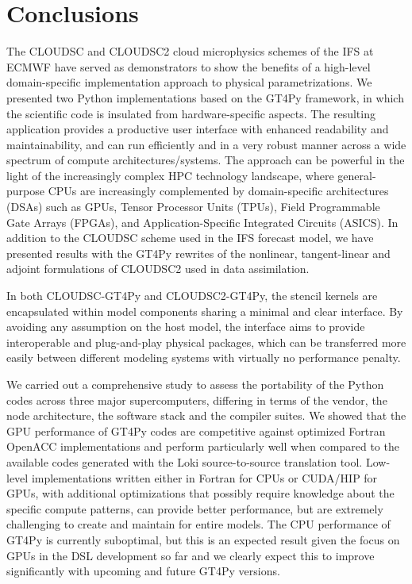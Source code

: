 \documentclass[main.tex]{subfiles}
\begin{document}
    \justifying

    \section{Conclusions}
    \label{section:conclusions}

        The CLOUDSC and CLOUDSC2 cloud microphysics schemes of the IFS at ECMWF have served as demonstrators to show the benefits of a high-level domain-specific implementation approach to physical parametrizations. We presented two Python implementations based on the GT4Py framework, in which the scientific code is insulated from hardware-specific aspects. The resulting application provides a productive user interface with enhanced readability and maintainability, and can run efficiently and in a very robust manner across a wide spectrum of compute architectures/systems. The approach can be powerful in the light of the increasingly complex HPC technology landscape, where general-purpose CPUs are increasingly complemented by domain-specific architectures (DSAs) such as GPUs, Tensor Processor Units (TPUs), Field Programmable Gate Arrays (FPGAs), and Application-Specific Integrated Circuits (ASICS). In addition to the CLOUDSC scheme used in the IFS forecast model, we have presented results with the GT4Py rewrites of the nonlinear, tangent-linear and adjoint formulations of CLOUDSC2 used in data assimilation.

        In both CLOUDSC-GT4Py and CLOUDSC2-GT4Py, the stencil kernels are encapsulated within model components sharing a minimal and clear interface. By avoiding any assumption on the host model, the interface aims to provide interoperable and plug-and-play physical packages, which can be transferred more easily between different modeling systems with virtually no performance penalty.

        We carried out a comprehensive study to assess the portability of the Python codes across three major supercomputers, differing in terms of the vendor, the node architecture, the software stack and the compiler suites. We showed that the GPU performance of GT4Py codes are competitive against optimized Fortran OpenACC implementations and perform particularly well when compared to the available codes generated with the Loki source-to-source translation tool. Low-level implementations written either in Fortran for CPUs or CUDA/HIP for GPUs, with additional optimizations that possibly require knowledge about the specific compute patterns, can provide better performance, but are extremely challenging to create and maintain for entire models. The CPU performance of GT4Py is currently suboptimal, but this is an expected result given the focus on GPUs in the DSL development so far and we clearly expect this to improve significantly with upcoming and future GT4Py versions. 
\end{document}
